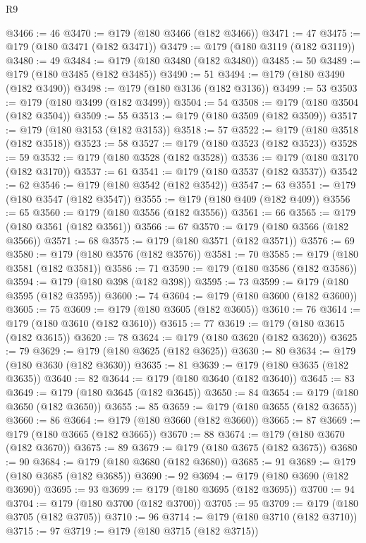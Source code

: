 \begin{lexlean}{R9}
\begin{coremodule}
{{{{{{{{{{{{{{{{{{{{{{{{{{{{{{{{{{{{{{{{{{{{{{{{{{{{{{{{{{{{{{{{{{{{{{{{{{{{{{{{{{{{@3466 := 46
@3470 := @179 (@180 @3466 (@182 @3466))
@3471 := 47
@3475 := @179 (@180 @3471 (@182 @3471))
@3479 := @179 (@180 @3119 (@182 @3119))
@3480 := 49
@3484 := @179 (@180 @3480 (@182 @3480))
@3485 := 50
@3489 := @179 (@180 @3485 (@182 @3485))
@3490 := 51
@3494 := @179 (@180 @3490 (@182 @3490))
@3498 := @179 (@180 @3136 (@182 @3136))
@3499 := 53
@3503 := @179 (@180 @3499 (@182 @3499))
@3504 := 54
@3508 := @179 (@180 @3504 (@182 @3504))
@3509 := 55
@3513 := @179 (@180 @3509 (@182 @3509))
@3517 := @179 (@180 @3153 (@182 @3153))
@3518 := 57
@3522 := @179 (@180 @3518 (@182 @3518))
@3523 := 58
@3527 := @179 (@180 @3523 (@182 @3523))
@3528 := 59
@3532 := @179 (@180 @3528 (@182 @3528))
@3536 := @179 (@180 @3170 (@182 @3170))
@3537 := 61
@3541 := @179 (@180 @3537 (@182 @3537))
@3542 := 62
@3546 := @179 (@180 @3542 (@182 @3542))
@3547 := 63
@3551 := @179 (@180 @3547 (@182 @3547))
@3555 := @179 (@180 @409 (@182 @409))
@3556 := 65
@3560 := @179 (@180 @3556 (@182 @3556))
@3561 := 66
@3565 := @179 (@180 @3561 (@182 @3561))
@3566 := 67
@3570 := @179 (@180 @3566 (@182 @3566))
@3571 := 68
@3575 := @179 (@180 @3571 (@182 @3571))
@3576 := 69
@3580 := @179 (@180 @3576 (@182 @3576))
@3581 := 70
@3585 := @179 (@180 @3581 (@182 @3581))
@3586 := 71
@3590 := @179 (@180 @3586 (@182 @3586))
@3594 := @179 (@180 @398 (@182 @398))
@3595 := 73
@3599 := @179 (@180 @3595 (@182 @3595))
@3600 := 74
@3604 := @179 (@180 @3600 (@182 @3600))
@3605 := 75
@3609 := @179 (@180 @3605 (@182 @3605))
@3610 := 76
@3614 := @179 (@180 @3610 (@182 @3610))
@3615 := 77
@3619 := @179 (@180 @3615 (@182 @3615))
@3620 := 78
@3624 := @179 (@180 @3620 (@182 @3620))
@3625 := 79
@3629 := @179 (@180 @3625 (@182 @3625))
@3630 := 80
@3634 := @179 (@180 @3630 (@182 @3630))
@3635 := 81
@3639 := @179 (@180 @3635 (@182 @3635))
@3640 := 82
@3644 := @179 (@180 @3640 (@182 @3640))
@3645 := 83
@3649 := @179 (@180 @3645 (@182 @3645))
@3650 := 84
@3654 := @179 (@180 @3650 (@182 @3650))
@3655 := 85
@3659 := @179 (@180 @3655 (@182 @3655))
@3660 := 86
@3664 := @179 (@180 @3660 (@182 @3660))
@3665 := 87
@3669 := @179 (@180 @3665 (@182 @3665))
@3670 := 88
@3674 := @179 (@180 @3670 (@182 @3670))
@3675 := 89
@3679 := @179 (@180 @3675 (@182 @3675))
@3680 := 90
@3684 := @179 (@180 @3680 (@182 @3680))
@3685 := 91
@3689 := @179 (@180 @3685 (@182 @3685))
@3690 := 92
@3694 := @179 (@180 @3690 (@182 @3690))
@3695 := 93
@3699 := @179 (@180 @3695 (@182 @3695))
@3700 := 94
@3704 := @179 (@180 @3700 (@182 @3700))
@3705 := 95
@3709 := @179 (@180 @3705 (@182 @3705))
@3710 := 96
@3714 := @179 (@180 @3710 (@182 @3710))
@3715 := 97
@3719 := @179 (@180 @3715 (@182 @3715))
}}}}}}}}}}}}}}}}}}}}}}}}}}}}}}}}}}}}}}}}}}}}}}}}}}}}}}}}}}}}}}}}}}}}}}}}}}}}}}}}}}}}
\end{coremodule}
\end{lexlean}
